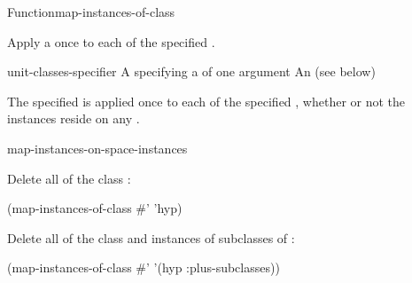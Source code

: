 \documentclass[10pt,twoside,english,pdftex]{article}
\begin{document}

\begin{functiondoc}{Function}{map-instances-of-class}%
{}
%
%

\fnsyntax

\fnpurpose Apply a  once to each  of the
specified . 

\fnpackage {}

\fnmodule {}

\fnargs
\begin{args}{unit-classes-specifier}
\arg[function] A  specifying a
  of one argument
 An 
(see below)
\end{args}

\fndsyntax
\W\supp\tabletop
\unitclassesspec
\subclassingspec

\fndescription The specified  is applied once to each
 of the specified , whether
or not the instances reside on any .

\begin{alsos}{map-instances-on-space-instances}
\end{alsos}

\fnexamples
Delete all  of the class :
%
\W\supp
\begin{example}
  (map-instances-of-class #' 'hyp)
\end{example} 
%
Delete all  of the class  and
instances of subclasses of :
%
\W\supp\notpretop
\begin{example}
  (map-instances-of-class #' '(hyp :plus-subclasses))
\end{example} 


\end{functiondoc}
\end{document}
